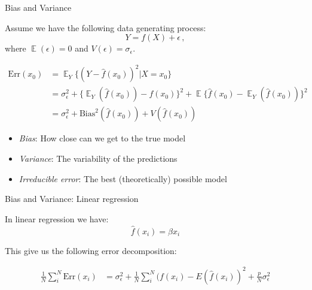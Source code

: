 \documentclass[10pt,handout]{beamer}
\DeclareMathOperator{\E}{\mathbb{E}}
\begin{document}
\begin{frame}{Bias and Variance}

Assume we have the following data generating process:
\[
Y = f(X) + \epsilon\,,
\]
where $\E(\epsilon)=0$ and $V(\epsilon)=\sigma_\epsilon$.

\begin{align*}
\text{Err}(x_0) &= \E_{Y}\{(Y-\hat{f}(x_0))^2 | X = x_0\} \\
  &= \sigma^2_\epsilon + \{\E_Y(\hat{f}(x_0)) - f(x_0)\}^2 + \E\{\hat{f}(x_0) - \E_Y(\hat{f}(x_0))\}^2 \\
  &= \sigma^2_\epsilon + \text{Bias}^2(\hat{f}(x_0)) + V(\hat{f}(x_0))
\end{align*}

\begin{itemize}
\item \emph{Bias}: How close can we get to the true model
\item \emph{Variance}: The variability of the predictions
\item \emph{Irreducible error}: The best (theoretically) possible model
\end{itemize}

\end{frame}


\begin{frame}{Bias and Variance: Linear regression}

In linear regression we have:
\[
\hat{f}(x_i) = \hat{\beta} x_i
\]

This give us the following error decomposition:

\begin{align*}
\frac{1}{N}\sum^N_i \text{Err}(x_i) &= \sigma^2_\epsilon + \frac{1}{N}\sum^N_i (f(x_i) - E(\hat{f}(x_i))^2 + \frac{p}{N} \sigma^2_\epsilon
\end{align*}

\end{frame}
\end{document}
